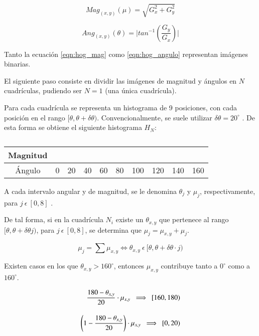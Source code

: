 \begin{equation}
	\label{eqn:hog_mag}
	Mag_{(x,y)} (\mu)= \sqrt{G_{x}^{2}+G_{y}^{2}}
\end{equation}

\begin{equation}
	\label{eqn:hog_angulo}
	Ang_{(x,y)} (\theta) = \lvert tan^{-1}(\dfrac{G_{y}}{G_{x}})\lvert
\end{equation}

Tanto la ecuación \ref{eqn:hog_mag} como \ref{eqn:hog_angulo} representan imágenes binarias.

El siguiente paso consiste en dividir las imágenes de magnitud y ángulos en $ N $ cuadrículas, pudiendo ser $ N = 1 $ (una única cuadrícula).

Para cada cuadrícula se representa un histograma de 9 posiciones, con cada posición en el rango $ [\theta,\theta+\delta\theta) $. Convencionalmente, se suele utilizar $\delta\theta = 20^{\circ}$ . De esta forma se obtiene el siguiente histograma $ H_{N}$:

\begin{table}[htb]
	\centering
	\caption{}
	\label{tab:hog_histograma_tabla}
	\begin{tabular}{|c||c|c|c|c|c|c|c|c|c|}
		\hline
		Magnitud &    &    &    &    &    &     &     &     &     \\ \hline
		Ángulo   & 0  & 20 & 40 & 60 & 80 & 100 & 120 & 140 & 160 \\ \hline
	\end{tabular}
\end{table}

A cada intervalo angular y de magnitud, se le denomina $ \theta_{j} $ y $ \mu_{j} $, respectivamente, para $ j\:\epsilon\:[0,8]$ .

De tal forma, si en la cuadrícula $ N_{i} $ existe un $\theta_{x,y}$ que pertenece al rango $ [\theta,\theta+\delta\theta j) $, para $ j\:\epsilon\:[0,8]$, se determina que $ \mu_{j} = \mu_{x,y} + \mu_{j}$.

\begin{equation}
	\label{eqn:hog_sum_magnitudes}
	\mu_{j} = \sum{\mu_{x,y}} \iff \theta_{x,y}\:\epsilon\:[\theta,\theta+\delta\theta \cdot j)
\end{equation}

Existen casos en los que $\theta_{x,y} > 160^{\circ}$, entonces $\mu_{x,y}$ contribuye tanto a $ 0^{\circ} $ como a $160^{\circ}$.

\begin{equation}
	\setlength{\jot}{14pt}
	\label{eqn:hog_angulo_mayor_de_160}
	\begin{split}
		\dfrac{180-\theta_{x,y}}{20}\cdot \mu_{x,y}\:\implies\: [160,180) \\
		\left(1-\dfrac{180-\theta_{x,y}}{20}\right)\cdot \mu_{x,y}\:\implies\: [0,20)
	\end{split}	
\end{equation}

